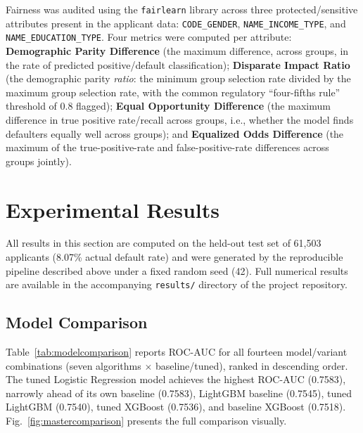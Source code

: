 \documentclass[journal]{IEEEtran}
\begin{document}
Fairness was audited using the \texttt{fairlearn} library across three protected/sensitive attributes present in the applicant data: \texttt{CODE\_GENDER}, \texttt{NAME\_INCOME\_TYPE}, and \texttt{NAME\_EDUCATION\_TYPE}. Four metrics were computed per attribute: \textbf{Demographic Parity Difference} (the maximum difference, across groups, in the rate of predicted positive/default classification); \textbf{Disparate Impact Ratio} (the demographic parity \emph{ratio}: the minimum group selection rate divided by the maximum group selection rate, with the common regulatory ``four-fifths rule'' threshold of 0.8 flagged); \textbf{Equal Opportunity Difference} (the maximum difference in true positive rate/recall across groups, i.e., whether the model finds defaulters equally well across groups); and \textbf{Equalized Odds Difference} (the maximum of the true-positive-rate and false-positive-rate differences across groups jointly).

\section{Experimental Results}
\label{sec:results}

All results in this section are computed on the held-out test set of 61,503 applicants (8.07\% actual default rate) and were generated by the reproducible pipeline described above under a fixed random seed (42). Full numerical results are available in the accompanying \texttt{results/} directory of the project repository.

\subsection{Model Comparison}

Table~\ref{tab:modelcomparison} reports ROC-AUC for all fourteen model/variant combinations (seven algorithms $\times$ baseline/tuned), ranked in descending order. The tuned Logistic Regression model achieves the highest ROC-AUC (0.7583), narrowly ahead of its own baseline (0.7583), LightGBM baseline (0.7545), tuned LightGBM (0.7540), tuned XGBoost (0.7536), and baseline XGBoost (0.7518). Fig.~\ref{fig:mastercomparison} presents the full comparison visually.
\end{document}

